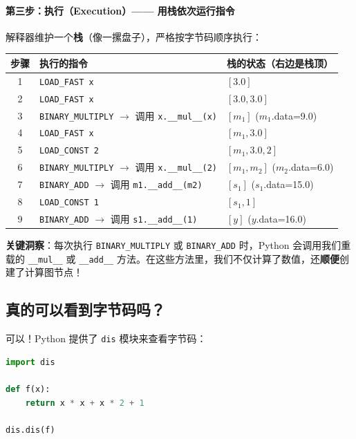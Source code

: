 \paragraph{第三步：执行（Execution）—— 用栈依次运行指令}

解释器维护一个\textbf{栈}（像一摞盘子），严格按字节码顺序执行：

\begin{center}
\small
\renewcommand{\arraystretch}{1.4}
\begin{tabular}{c|l|l}
\toprule
\textbf{步骤} & \textbf{执行的指令} & \textbf{栈的状态}（右边是栈顶） \\
\midrule
1 & \texttt{LOAD\_FAST x} & $[3.0]$ \\
2 & \texttt{LOAD\_FAST x} & $[3.0, 3.0]$ \\
3 & \texttt{BINARY\_MULTIPLY} $\to$ 调用 \texttt{x.\_\_mul\_\_(x)} & $[m_1]$ \quad ($m_1$.data=9.0) \\
\midrule
4 & \texttt{LOAD\_FAST x} & $[m_1, 3.0]$ \\
5 & \texttt{LOAD\_CONST 2} & $[m_1, 3.0, 2]$ \\
6 & \texttt{BINARY\_MULTIPLY} $\to$ 调用 \texttt{x.\_\_mul\_\_(2)} & $[m_1, m_2]$ \quad ($m_2$.data=6.0) \\
\midrule
7 & \texttt{BINARY\_ADD} $\to$ 调用 \texttt{m1.\_\_add\_\_(m2)} & $[s_1]$ \quad ($s_1$.data=15.0) \\
\midrule
8 & \texttt{LOAD\_CONST 1} & $[s_1, 1]$ \\
9 & \texttt{BINARY\_ADD} $\to$ 调用 \texttt{s1.\_\_add\_\_(1)} & $[y]$ \quad ($y$.data=16.0) \\
\bottomrule
\end{tabular}
\end{center}

\textbf{关键洞察}：每次执行 \texttt{BINARY\_MULTIPLY} 或 \texttt{BINARY\_ADD} 时，Python 会调用我们重载的 \texttt{\_\_mul\_\_} 或 \texttt{\_\_add\_\_} 方法。在这些方法里，我们不仅计算了数值，还\textbf{顺便}创建了计算图节点！

\subsection*{真的可以看到字节码吗？}

可以！Python 提供了 \texttt{dis} 模块来查看字节码：

\begin{lstlisting}[style=teaching, language=Python]
import dis

def f(x):
    return x * x + x * 2 + 1

dis.dis(f)
\end{lstlisting}


